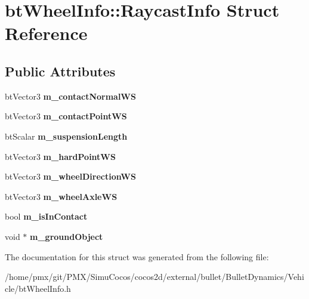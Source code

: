 \hypertarget{structbtWheelInfo_1_1RaycastInfo}{}\section{bt\+Wheel\+Info\+:\+:Raycast\+Info Struct Reference}
\label{structbtWheelInfo_1_1RaycastInfo}
\subsection*{Public Attributes}
\begin{DoxyCompactItemize}
\item 
\mbox{\label{structbtWheelInfo_1_1RaycastInfo_adc58f3c5e33effc66e5053ab7dbac97e}} 
bt\+Vector3 {\bfseries m\+\_\+contact\+Normal\+WS}
\item 
\mbox{\label{structbtWheelInfo_1_1RaycastInfo_a1ceb3b86560dbc522c2ae561d391f862}} 
bt\+Vector3 {\bfseries m\+\_\+contact\+Point\+WS}
\item 
\mbox{\label{structbtWheelInfo_1_1RaycastInfo_a1445bf7ab2e44074441aab67201b1ba1}} 
bt\+Scalar {\bfseries m\+\_\+suspension\+Length}
\item 
\mbox{\label{structbtWheelInfo_1_1RaycastInfo_a830900f74e600cceb69359c7ad3f2a91}} 
bt\+Vector3 {\bfseries m\+\_\+hard\+Point\+WS}
\item 
\mbox{\label{structbtWheelInfo_1_1RaycastInfo_a533049ce1763d2f53e7063d96f406271}} 
bt\+Vector3 {\bfseries m\+\_\+wheel\+Direction\+WS}
\item 
\mbox{\label{structbtWheelInfo_1_1RaycastInfo_a0e4312377529bd15f081a2af9cc02b22}} 
bt\+Vector3 {\bfseries m\+\_\+wheel\+Axle\+WS}
\item 
\mbox{\label{structbtWheelInfo_1_1RaycastInfo_a29c172936558437da29af8fef741afda}} 
bool {\bfseries m\+\_\+is\+In\+Contact}
\item 
\mbox{\label{structbtWheelInfo_1_1RaycastInfo_af3f869c6ddbc88d0a22fc2c44c9e07d3}} 
void $\ast$ {\bfseries m\+\_\+ground\+Object}
\end{DoxyCompactItemize}


The documentation for this struct was generated from the following file\+:\begin{DoxyCompactItemize}
\item 
/home/pmx/git/\+P\+M\+X/\+Simu\+Cocos/cocos2d/external/bullet/\+Bullet\+Dynamics/\+Vehicle/bt\+Wheel\+Info.\+h\end{DoxyCompactItemize}

